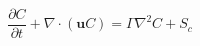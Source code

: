 \begin{equation}
\frac{\partial C}{\partial t}
+ \nabla\cdot\left(\mathbf{u} C\right)
= \Gamma\nabla^2 C
+ S_c
\label{eq:eulerian_pde}
\end{equation}